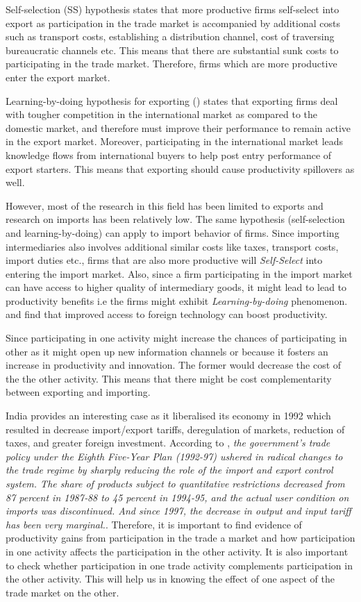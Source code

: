 \documentclass[11pt]{article}
\begin{document}
Self-selection (SS) hypothesis states that  more productive firms
self-select into export  as  
participation in the trade market is accompanied by additional costs
such as transport costs, establishing a distribution channel,
cost of traversing bureaucratic channels  etc. This means that there
are substantial sunk costs to participating in the trade
market. Therefore, firms which are more productive enter the
export market. 

Learning-by-doing hypothesis for exporting (\textcite{haidar2012trade}) states that exporting firms deal with
tougher competition in the international market as compared to the
domestic market, and therefore must improve their performance to
remain active in the export market. Moreover, participating in the
international market leads knowledge flows from international buyers
to help post entry performance of export starters. This means that exporting should
cause productivity spillovers as well.

However, most of the research in this field has been limited to
exports and research on imports has been relatively low. The same hypothesis (self-selection and learning-by-doing) can  apply
to import behavior of firms. Since importing intermediaries also
involves additional
similar costs like  taxes, transport costs, import duties
etc., firms that are also more productive will \textit{Self-Select}
into entering the import market. Also, since a firm
participating in the import market can have access to higher quality
of intermediary goods, it might lead to lead to productivity benefits
i.e the firms might exhibit \textit{Learning-by-doing} phenomenon. 
\textcite{topalova2011trade}  and \textcite{halpern2011imported}
find that improved access to foreign technology can boost
productivity. 

Since participating in one activity might increase the chances of
participating in other as it might open up new information
channels or because it fosters an increase in productivity and
innovation. The former would decrease the cost of the the other
activity. This means that there might be cost complementarity between
exporting and importing.  

India provides an interesting case as it liberalised its economy in
1992 which resulted in decrease import/export
tariffs, deregulation of markets, reduction of taxes, and greater 
foreign investment. According to \textcite{topalova2011trade}, \textit{the government's trade policy under the Eighth Five-Year Plan (1992-97) ushered
in radical changes to the trade regime by sharply reducing the role of
the import and export control system. The share of products subject to quantitative restrictions
decreased from 87 percent in 1987‐88 to 45 percent in 1994-95, and the actual user
condition on imports was discontinued. And since 1997, the decrease in
output and input tariff has been very marginal.}. Therefore, it is
important to find evidence of productivity gains from participation in
the trade a market and how participation in one activity affects the
participation in the other activity. It is also important to check
whether participation in one trade activity complements participation
in the other activity. This will help us in knowing the effect of one
aspect of the trade market on the other. 
\end{document}
